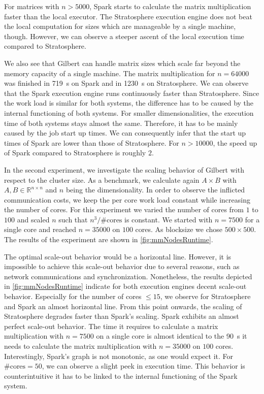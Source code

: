 For matrices with $n>5000$, Spark starts to calculate the matrix multiplication faster than the local executor.
The Stratosphere execution engine does not beat the local computation for sizes which are manageable by a single machine, though.
However, we can observe a steeper ascent of the local execution time compared to Stratosphere.

We also see that Gilbert can handle matrix sizes which scale far beyond the memory capacity of a single machine.
The matrix multiplication for $n=64000$ was finished in \SI{719}{\second} on Spark and in \SI{1230}{\second} on Stratosphere.
We can observe that the Spark execution engine runs continuously faster than Stratosphere.
Since the work load is similar for both systems, the difference has to be caused by the internal functioning of both systems.
For smaller dimensionalities, the execution time of both systems stays almost the same.
Therefore, it has to be mainly caused by the job start up times.
We can consequently infer that the start up times of Spark are lower than those of Stratosphere.
For $n>10000$, the speed up of Spark compared to Stratosphere is roughly $2$.

In the second experiment, we investigate the scaling behavior of Gilbert with respect to the cluster size.
As a benchmark, we calculate again $A\times B$ with $A,B \in \mathbb{R}^{n\times n}$ and $n$ being the dimensionality.
In order to observe the inflicted communication costs, we keep the per core work load constant while increasing the number of cores.
For this experiment we varied the number of cores from $1$ to $100$ and scaled $n$ such that $n^3/\#\text{cores}$ is constant.
We started with $n=7500$ for a single core and reached $n=35000$ on $100$ cores.
As blocksize we chose $500\times 500$.
The results of the experiment are shown in \cref{fig:mmNodesRuntime}.

The optimal scale-out behavior would be a horizontal line.
However, it is impossible to achieve this scale-out behavior due to several reasons, such as network communications and synchronization.
Nonetheless, the results depicted in \cref{fig:mmNodesRuntime} indicate for both execution engines decent scale-out behavior.
Especially for the number of cores $\le 15$, we observe for Stratosphere and Spark an almost horizontal line.
From this point onwards, the scaling of Stratosphere degrades faster than Spark's scaling.
Spark exhibits an almost perfect scale-out behavior.
The time it requires to calculate a matrix multiplication with $n=7500$ on a single core is almost identical to the \SI{90}{\second} it needs to calculate the matrix multiplication with $n=35000$ on $100$ cores.
Interestingly, Spark's graph is not monotonic, as one would expect it.
For $\text{\#cores}=50$, we can observe a slight peek in execution time.
This behavior is counterintuitive it has to be linked to the internal functioning of the Spark system.

